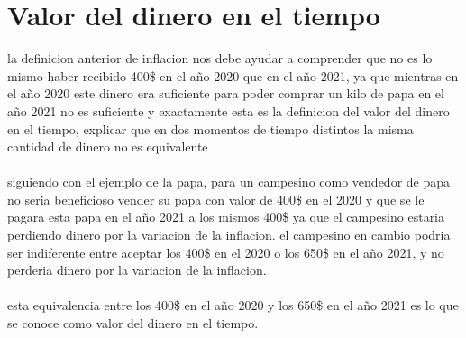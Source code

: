 \documentclass{article}
\begin{document}
\section{Valor del dinero en el tiempo}
\begin{flushleft}

la definicion anterior de inflacion nos debe ayudar a comprender que no es lo mismo haber recibido 400\$ en el año 2020 que en el año 2021, ya que mientras en el año 2020 este dinero era suficiente para poder comprar un kilo de papa en el año 2021 no es suficiente y exactamente esta es la definicion del valor del dinero en el tiempo, explicar que en dos momentos de tiempo distintos la misma cantidad de dinero no es equivalente\\~\\
siguiendo con el ejemplo de la papa, para un campesino como vendedor de papa no seria beneficioso vender su papa con valor de 400\$ en el 2020 y que se le pagara esta papa en el año 2021 a los mismos 400\$ ya que el campesino estaria perdiendo dinero por la variacion de la inflacion.
el campesino en cambio podria ser indiferente entre aceptar los 400\$ en el 2020 o los 650\$ en el año 2021, y no perderia dinero por la variacion de la inflacion.\\~\\

esta equivalencia entre los 400\$ en el año 2020 y los 650\$ en el año 2021 es lo que se conoce como valor del dinero en el tiempo.

\end{flushleft}
\end{document}
